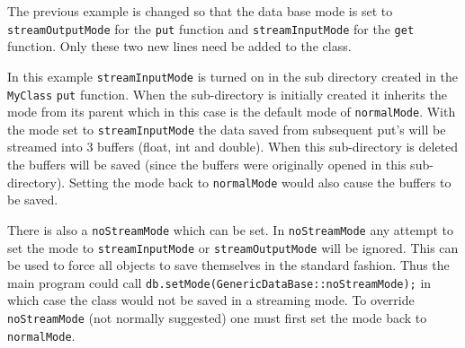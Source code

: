 \documentclass{article}
\begin{document}
The previous example is changed so that
the data base mode is set to {\tt streamOutputMode} for the {\tt put} function
and  {\tt streamInputMode} for the {\tt get} function. Only these two new lines
need be added to the class.

In this example {\tt streamInputMode} is turned on in the sub directory created
in the {\tt MyClass} {\tt put} function. When the sub-directory is initially created it inherits
the mode from its parent which in this case is the default mode of {\tt normalMode}.
With the mode set to {\tt streamInputMode} the data saved from subsequent put's 
will be streamed into 3 buffers (float, int and double).
When this sub-directory is deleted the buffers will be saved (since the buffers were
originally opened in this sub-directory). 
Setting the mode back to {\tt normalMode} would also cause the buffers to be saved. 


There is also a {\tt noStreamMode}
which can be set. In {\tt noStreamMode} any attempt to set the mode to {\tt streamInputMode} or
{\tt streamOutputMode} will be ignored. 
This can be used
to force all objects to save themselves in the standard fashion. Thus the main program
could call {\tt db.setMode(GenericDataBase::noStreamMode);} in which case the class
would not be saved in a streaming mode.
To override {\tt noStreamMode} (not normally suggested) 
one must first set the mode back to {\tt normalMode}.
\end{document}
